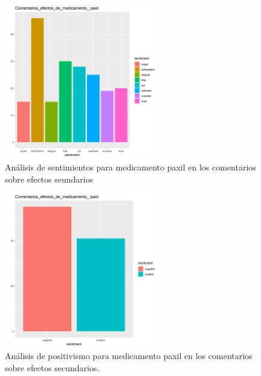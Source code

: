 \documentclass[spanish,]{article}
\begin{document}
\begin{figure}[h]
    \centering
    \includegraphics[width=0.6\textwidth]{figuras/sentimientos/Bpaxil1.png}
    \caption{Análisis de sentimientos para medicamento paxil en los comentarios sobre efectos seundarios}
    \label{fig:sentimientos:31}
\end{figure}

\begin{figure}[h]
    \centering
    \includegraphics[width=0.6\textwidth]{figuras/sentimientos/Bpaxil2.png}
    \caption{Análisis de positivismo para medicamento paxil en los comentarios sobre efectos secundarios.}
    \label{fig:sentimientos:32}
\end{figure}
\end{document}
